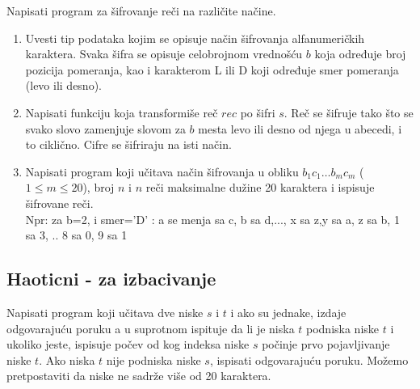\begin{Exercise}[label=p2.3_] Napisati program za šifrovanje reči na različite načine.
\begin{enumerate}
 \item  Uvesti tip podataka  kojim se opisuje način
   šifrovanja alfanumeričkih karaktera.  Svaka šifra se
   opisuje celobrojnom vrednošću $b$ koja određuje broj
   pozicija pomeranja, kao i karakterom L ili D koji
   određuje smer pomeranja (levo ili desno).
  \item Napisati funkciju 
    koja transformiše reč $rec$ po šifri
    $s$. Reč se šifruje tako što se svako slovo
    zamenjuje slovom za $b$ mesta levo ili desno od njega u
    abecedi, i to ciklično. Cifre se šifriraju na isti način.
 \item Napisati program koji učitava način šifrovanja u
   obliku $b_1 c_1 \ldots b_m c_m$ ($1\leq m \leq 20$), broj $n$ i $n$ re\v ci maksimalne dužine 20 karaktera i ispisuje šifrovane reči.\\
Npr: za b=2,
    i smer='D' : a se menja sa c, b sa d,..., x sa z,y sa a, z sa b, 1
    sa 3, .. 8 sa 0, 9 sa 1
\end{enumerate}
\end{Exercise}
\begin{Answer}[ref=p2.3_]
\end{Answer}


\subsection{Haoticni - za izbacivanje}


\begin{Exercise}[label=v2.3_07] 
   Napisati program koji učitava dve niske $s$ i $t$ i ako su jednake, izdaje odgovarajuću poruku a u suprotnom ispituje da li je niska $t$ podniska niske $t$ i ukoliko jeste, ispisuje počev od kog indeksa niske $s$ počinje prvo pojavljivanje niske $t$. Ako niska $t$ nije podniska niske $s$, ispisati odgovarajuću poruku. Možemo
   pretpostaviti da niske ne sadrže više od 20 karaktera.\\
\end{Exercise}
\begin{Answer}[ref=v2.3_07]
\end{Answer}


